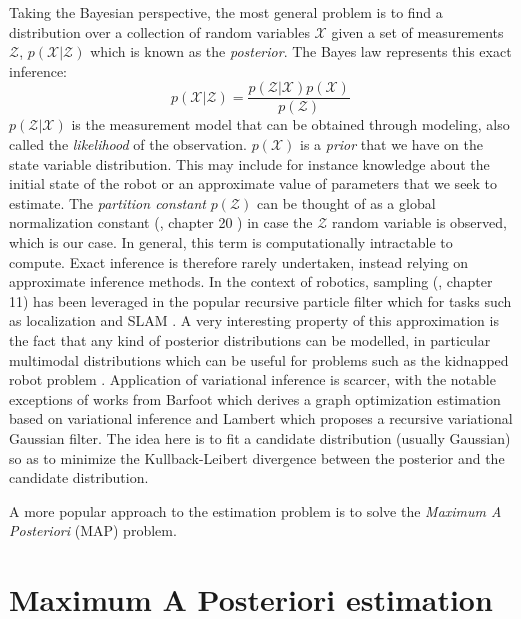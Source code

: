 Taking the Bayesian perspective, the most general problem is to find a distribution over a collection of random variables $\mathcal{X}$ given a set 
of measurements $\mathcal{Z}$, $p(\mathcal{X} | \mathcal{Z})$ which is known as the \textit{posterior}. 
The Bayes law represents this exact inference:
%
\begin{equation}
    p(\mathcal{X} | \mathcal{Z}) = \frac{p(\mathcal{Z} | \mathcal{X}) p(\mathcal{X})}{p(\mathcal{Z})} 
\end{equation}
%
$p(\mathcal{Z} | \mathcal{X})$ is the measurement model that can be obtained through modeling, also called the \textit{likelihood} of the observation. 
$p(\mathcal{X})$ is a \textit{prior} that we have on the state variable distribution. This may include for instance knowledge about the initial state of the robot or
an approximate value of parameters that we seek to estimate.
The \textit{partition constant} $p(\mathcal{Z})$ can be thought of as a global normalization constant (\cite{koller2009probabilistic}, chapter 20 ) in case 
the $\mathcal{Z}$ random variable is observed, which is our case. In general, this term is computationally intractable to compute. Exact inference is 
therefore rarely undertaken, instead relying on approximate inference methods. In the context of robotics, sampling (\cite{koller2009probabilistic}, chapter 11) has been 
leveraged in the popular recursive particle filter which for tasks such as localization \cite{dellaert1999monte} and SLAM \cite{montemerlo2002fastslam}. A very interesting
property of this approximation is the fact that any kind of posterior distributions can be modelled, in particular multimodal distributions which can be useful
for problems such as the kidnapped robot problem \cite{dellaert1999monte}. Application of variational inference is scarcer, with the notable 
exceptions of works from Barfoot \cite{barfoot2020exactly, wong2020variational} which derives a graph optimization estimation based on variational inference
and Lambert \cite{lambert2022recursive} which proposes a recursive variational Gaussian filter. The idea here is to fit a candidate distribution 
(usually Gaussian) so as to minimize the Kullback-Leibert divergence between the posterior and the candidate distribution.

A more popular approach to the estimation problem is to solve the \textit{Maximum A Posteriori} (MAP) problem.

\section{Maximum A Posteriori estimation}

